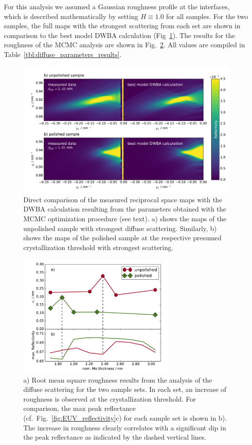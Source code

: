 For this analysis we assumed a Gaussian roughness profile at the interfaces, which is described mathematically by setting $H\equiv1.0$ for all samples. For the two samples, the full maps with the strongest scattering from each set are shown in comparison to the best model DWBA calculation (Fig~\ref{fig:dwba_data_best_model_comparison}). The results for the roughness of the MCMC analysis are shown in Fig.~\ref{fig:PSD_results}. All values are compiled in Table~\ref{tbl:diffuse_parameters_results}. 
\begin{figure}[htbp]
\centering
\includegraphics[width=\textwidth]{images/dwba_data_best_model_comparison}
\caption{Direct comparison of the measured reciprocal space maps with the DWBA calculation resulting from the parameters obtained with the MCMC optimization procedure (see text). a) shows the maps of the unpolished sample with strongest diffuse scattering. Similarly, b) shows the maps of the polished sample at the respective presumed crystallization threshold with strongest scattering.}
\label{fig:dwba_data_best_model_comparison}
\end{figure}
\begin{figure}[htbp]
\centering
\includegraphics[width=0.7\textwidth]{images/PSD_results}
\caption{a) Root mean square roughness results from the analysis of the diffuse scattering for the two sample sets. In each set, an increase of roughness is observed at the crystallization threshold. For comparison, the max peak reflectance (cf.~Fig.~\ref{fig:EUV_reflectivity}c) for each sample set is shown in b). The increase in roughness clearly correlates with a significant dip in the peak reflectance as indicated by the dashed vertical lines.}
\label{fig:PSD_results}
\end{figure}
